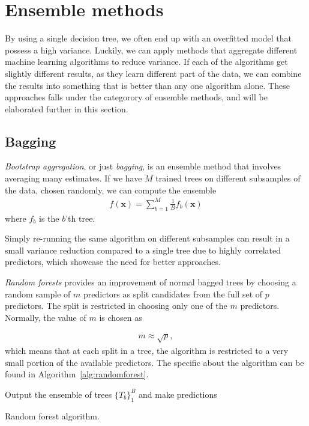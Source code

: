 \section{Ensemble methods}

By using a single decision tree, we often end up with an overfitted model that possess a high variance. Luckily, we can apply methods that aggregate different machine learning algorithms to reduce variance. If each of the algorithms get slightly different results, as they learn different part of the data, we can combine the results into something that is better than any one algorithm alone. These approaches falls under the categorory of ensemble methods, and will be elaborated further in this section. %

\subsection{Bagging}

\textit{Bootstrap aggregation}, or just \textit{bagging}, is an ensemble method that involves averaging many estimates. If we have $M$ trained trees on different subsamples of the data, chosen randomly, we can compute the ensemble
\begin{align}
  f(\textbf{x}) = \sum_{b=1}^M \frac{1}{B}f_b(\textbf{x})
\end{align}
where $f_b$ is the $b$'th tree.

Simply re-running the same algorithm on different subsamples can result in a small variance reduction compared to a single tree due to highly correlated predictors, which showcase the need for better approaches.

\textit{Random forests} provides an improvement of normal bagged trees by choosing a random sample of $m$ predictors as split candidates from the full set of $p$ predictors. The split is restricted in choosing only one of the $m$ predictors. Normally, the value of $m$ is chosen as

\begin{align}
  m \approx \sqrt{p},
\end{align}
which means that at each split in a tree, the algorithm is restricted to a very small portion of the available predictors. The specific about the algorithm can be found in Algorithm~\ref{alg:randomforest}.

\begin{algorithm}[H]
\SetAlgoLined
 Output the ensemble of trees $\{T_b\}_1^B$ and make predictions
 \caption{Random forest algorithm.}
 \label{alg:randomforest}
\end{algorithm}


